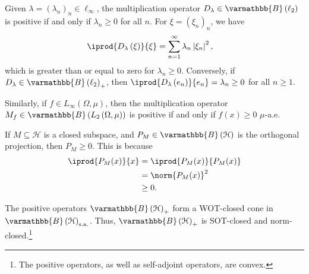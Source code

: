 \documentclass[10pt]{mypackage}
\renewcommand*{\mathbb}[1]{\varmathbb{#1}}
\newcommand{\sa}{\text{s.a.}}
\newcommand{\B}{\mathbb{B}}
\begin{document}
\begin{example}
  Given $\lambda = \left(\lambda_n\right)_n\in \ell_{\infty}$, the multiplication operator $D_{\lambda}\in \B\left(\ell_2\right)$ is positive if and only if $\lambda_n\geq 0$ for all $n$. For $\xi = \left(\xi_n\right)_n$, we have
  \begin{align*}
    \iprod{D_{\lambda}\left(\xi\right)}{\xi} &= \sum_{n=1}^{\infty}\lambda_n\left\vert \xi_n \right\vert^2,
  \end{align*}
  which is greater than or equal to zero for $\lambda_n \geq 0$. Conversely, if $D_{\lambda}\in \B\left(\ell_2\right)_{+}$, then $ \iprod{D_{\lambda}\left(e_n\right)}{e_n} = \lambda_n \geq 0 $ for all $n\geq 1$.\newline

  Similarly, if $f\in L_{\infty}\left(\Omega,\mu\right)$, then the multiplication operator $M_{f}\in \B\left(L_{2}\left(\Omega,\mu\right)\right)$ is positive if and only if $f(x)\geq 0$ $\mu$-a.e.
\end{example}
\begin{example}
  If $M\subseteq \mathcal{H}$ is a closed subspace, and $P_{M}\in \B\left(\mathcal{H}\right)$ is the orthogonal projection, then $P_M \geq 0$. This is because
  \begin{align*}
    \iprod{P_M(x)}{x} &= \iprod{P_M(x)}{P_M(x)}\\
                      &= \norm{P_M(x)}^2\\
                      &\geq 0.
  \end{align*}
\end{example}
\begin{proposition}
  The positive operators $\B\left(\mathcal{H}\right)_{+}$ form a WOT-closed cone in $\B\left(\mathcal{H}\right)_{\sa}$. Thus, $\B\left(\mathcal{H}\right)_{+}$ is SOT-closed and norm-closed.\footnote{The positive operators, as well as self-adjoint operators, are convex.}
\end{proposition}
\end{document}
